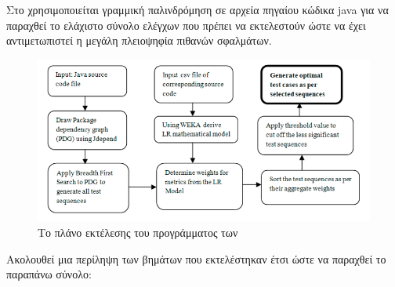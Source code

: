 \documentclass[12pt]{article}
\begin{document}
\par Στο \textcite{divya} χρησιμοποιείται γραμμική παλινδρόμηση σε αρχεία πηγαίου κώδικα java για να παραχθεί το ελάχιστο σύνολο ελέγχων που πρέπει να εκτελεστούν ώστε να έχει αντιμετωπιστεί η μεγάλη πλειοψηφία πιθανών σφαλμάτων.

\begin{figure}
\label{fig:regression}
\caption{Το πλάνο εκτέλεσης του προγράμματος των \textcite{divya}}
\includegraphics[width=\textwidth,height=\textheight,keepaspectratio]{regression_plan.PNG}
\end{figure}

\par Ακολουθεί μια περίληψη των βημάτων που εκτελέστηκαν έτσι ώστε να παραχθεί το παραπάνω σύνολο:
\end{document}
